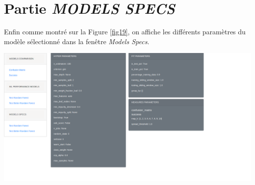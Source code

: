 \section{Partie \textit{MODELS SPECS}}

Enfin comme montré sur la Figure \ref{fig19}, on affiche les différents paramètres du modèle sélectionné dans la fenêtre \textit{Models Specs}.

\begin{center}
\includegraphics[width=1\textwidth]{figures/app_specs.png}
\label{fig19}
\end{center}
